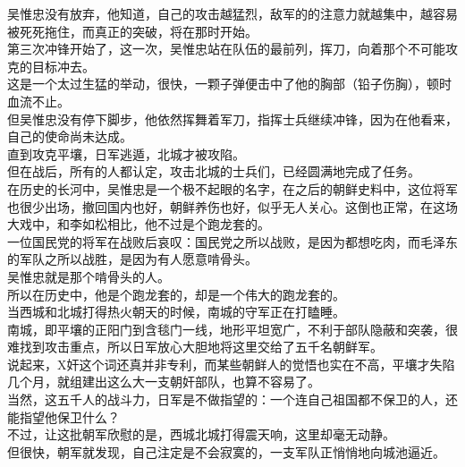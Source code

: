 \begin{multicols}{\theparacolNo}
吴惟忠没有放弃，他知道，自己的攻击越猛烈，敌军的的注意力就越集中，越容易被死死拖住，而真正的突破，将在那时开始。\\

第三次冲锋开始了，这一次，吴惟忠站在队伍的最前列，挥刀，向着那个不可能攻克的目标冲去。\\

这是一个太过生猛的举动，很快，一颗子弹便击中了他的胸部（铅子伤胸），顿时血流不止。\\

但吴惟忠没有停下脚步，他依然挥舞着军刀，指挥士兵继续冲锋，因为在他看来，自己的使命尚未达成。\\

直到攻克平壤，日军逃遁，北城才被攻陷。\\

但在战后，所有的人都认定，攻击北城的士兵们，已经圆满地完成了任务。\\

在历史的长河中，吴惟忠是一个极不起眼的名字，在之后的朝鲜史料中，这位将军也很少出场，撤回国内也好，朝鲜养伤也好，似乎无人关心。这倒也正常，在这场大戏中，和李如松相比，他不过是个跑龙套的。\\

一位国民党的将军在战败后哀叹：国民党之所以战败，是因为都想吃肉，而毛泽东的军队之所以战胜，是因为有人愿意啃骨头。\\

吴惟忠就是那个啃骨头的人。\\

所以在历史中，他是个跑龙套的，却是一个伟大的跑龙套的。\\

当西城和北城打得热火朝天的时候，南城的守军正在打瞌睡。\\

南城，即平壤的正阳门到含毯门一线，地形平坦宽广，不利于部队隐蔽和突袭，很难找到攻击重点，所以日军放心大胆地将这里交给了五千名朝鲜军。\\

说起来，X奸这个词还真并非专利，而某些朝鲜人的觉悟也实在不高，平壤才失陷几个月，就组建出这么大一支朝奸部队，也算不容易了。\\

当然，这五千人的战斗力，日军是不做指望的：一个连自己祖国都不保卫的人，还能指望他保卫什么？\\

不过，让这批朝军欣慰的是，西城北城打得震天响，这里却毫无动静。\\

但很快，朝军就发现，自己注定是不会寂寞的，一支军队正悄悄地向城池逼近。\\


\end{multicols}
